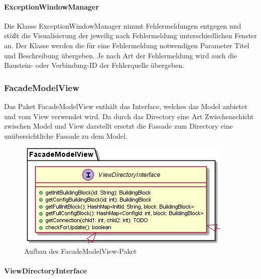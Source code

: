 \documentclass[parskip=full]{scrartcl}
\begin{document}
\paragraph{ExceptionWindowManager}

Die Klasse ExceptionWindowManager nimmt Fehlermeldungen entgegen und stößt die Visualisierung der jeweilig nach Fehlermeldung unterschiedlichen Fenster an. Der Klasse werden die für eine Fehlermeldung notwendigen Parameter Titel und  Beschreibung übergeben. Je nach Art der Fehlermeldung wird auch die Baustein- oder Verbindung-ID der Fehlerquelle übergeben.

\subsubsection {FacadeModelView}

Das Paket FacadeModelView enthält das Interface, welches das Model anbietet und vom View verwendet wird. Da durch das Directory eine Art Zwischenschicht zwischen Model und View darstellt ersetzt die Fassade zum Directory eine unübersichtliche Fassade zu dem Model. 

\begin{figure}[htbp]
	\begin{center}
		\includegraphics[width = 12 cm]{Grafiken/View/FacadeModelViewNamespace.png}
		\caption{Aufbau des FacadeModelView-Paket}
		\label{Entwurf_Grob}
	\end{center}
\end{figure}

\paragraph{ViewDirectoryInterface}
\end{document}
